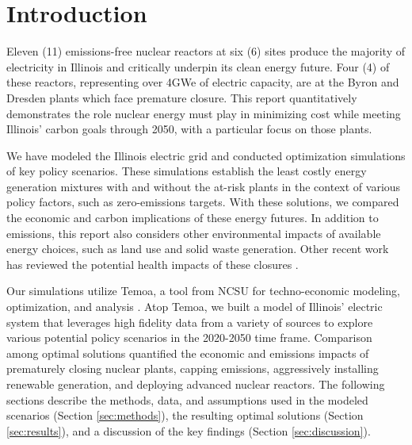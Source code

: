 \section{Introduction}\label{sec:intro}
Eleven (11) emissions-free nuclear reactors at six (6) sites produce the majority of
electricity in Illinois and critically underpin its clean energy future. Four 
(4) of these reactors, representing over 4GWe of electric capacity, are at the Byron 
and Dresden plants which face premature closure. This
report quantitatively demonstrates the role nuclear energy must play in
minimizing cost while meeting Illinois’ carbon goals through 2050, with a 
particular focus on those plants. 

We have 
modeled the Illinois electric grid and conducted optimization simulations of 
key policy scenarios. These simulations establish the least costly energy 
generation mixtures with and without the at-risk plants in the context of 
various policy factors, such as zero-emissions targets. 
With these solutions, we compared the economic and carbon implications of these energy futures. 
In addition to emissions, this report also considers
other environmental impacts of available energy choices, such as land use and
solid waste generation. Other recent work has reviewed the potential health 
impacts of these closures \cite{catf_potential_2021}.

Our simulations utilize Temoa, a tool from \gls{NCSU} for techno-economic 
modeling, optimization, and analysis 
\cite{decarolis_temoa_2010,decarolis_modelling_2016,decarolis_formalizing_2017}.  
Atop Temoa, we built a model of Illinois' electric system that leverages high 
fidelity data from a variety of sources to explore various potential policy 
scenarios in the 2020-2050 time frame.  Comparison among optimal solutions 
quantified the economic and emissions impacts of prematurely closing nuclear 
plants, capping emissions, aggressively installing renewable generation, and 
deploying advanced nuclear reactors.  The following sections describe the 
methods, data, and assumptions used in the modeled scenarios (Section 
\ref{sec:methods}), the resulting optimal solutions (Section 
\ref{sec:results}), and a discussion of the key findings (Section 
\ref{sec:discussion}).  
